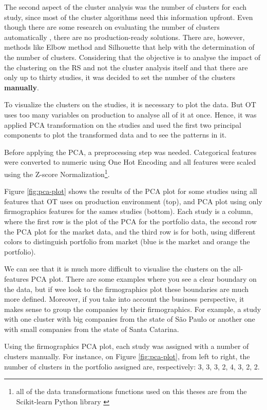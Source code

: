 The second aspect of the cluster analysis was the number of clusters for each study, since most of the cluster algorithms need this information upfront. Even though there are some research on evaluating the number of clusters automatically \cite{yu2014automatic}, there are no production-ready solutions. There are, however, methods like Elbow method and Silhouette \cite{kodinariya2013review} that help with the determination of the number of clusters. Considering that the objective is to analyse the impact of the clustering on the RS and not the cluster analysis itself and that there are only up to thirty studies, it was decided to set the number of the clusters \textbf{manually}.

To visualize the clusters on the studies, it is necessary to plot the data. But OT uses too many variables on production to analyse all of it at once. Hence, it was applied PCA transformation on the studies and used the first two principal components to plot the transformed data and to see the patterns in it. 

Before applying the PCA, a preprocessing step was needed. Categorical features were converted to numeric using One Hot Encoding and all features were scaled using the Z-score Normalization\footnote{all of the data transformations functions used on this theses are from the Scikit-learn Python library \cite{scikit-learn}}.

Figure \ref{fig:pca-plot} shows the results of the PCA plot for some studies using all features that OT uses on production environment (top), and PCA plot using only firmographics features for the sames studies (bottom). Each study is a column, where the first row is the plot of the PCA for the portfolio data, the second row the PCA plot for the market data, and the third row is for both, using different colors to distinguish portfolio from market (blue is the market and orange the portfolio).

We can see that it is much more difficult to visualise the clusters on the all-features PCA plot. There are some examples where you see a clear boundary on the data, but if wee look to the firmographics plot these boundaries are much more defined. Moreover, if you take into account the business perspective, it makes sense to group the companies by their firmographics. For example, a study with one cluster with big companies from the state of São Paulo or another one with small companies from the state of Santa Catarina.

Using the firmographics PCA plot, each study was assigned with a number of clusters manually. For instance, on Figure \ref{fig:pca-plot}, from left to right, the number of clusters in the portfolio assigned are, respectively: 3, 3, 3, 2, 4, 3, 2, 2.  

